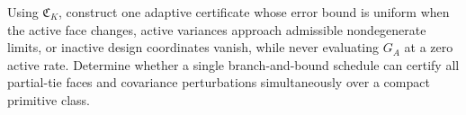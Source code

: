 Using \(\mathfrak C_K\), construct one adaptive certificate whose error bound is uniform when the active face changes, active variances approach admissible nondegenerate limits, or inactive design coordinates vanish, while never evaluating \(G_A\) at a zero active rate. Determine whether a single branch-and-bound schedule can certify all partial-tie faces and covariance perturbations simultaneously over a compact primitive class.